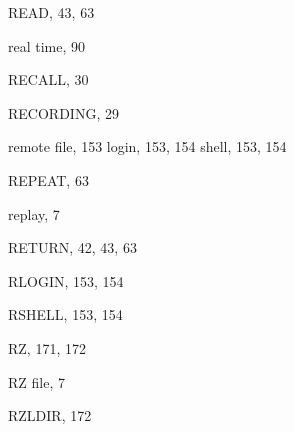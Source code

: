 \begin{theindex}
  \indexspace

  \item {\ttfamily  READ}, 43, 63
  \item real time, 90
  \item {\ttfamily  RECALL}, 30
  \item {\ttfamily  RECORDING}, 29
  \item remote
    \subitem file, 153
    \subitem login, 153, 154
    \subitem shell, 153, 154
  \item {\ttfamily  REPEAT}, 63
  \item replay, 7
  \item {\ttfamily  RETURN}, 42, 43, 63
  \item RLOGIN, 153, 154
  \item RSHELL, 153, 154
  \item RZ, 171, 172
  \item RZ file, 7
  \item {\ttfamily  RZLDIR}, 172

  \indexspace


\end{theindex}
